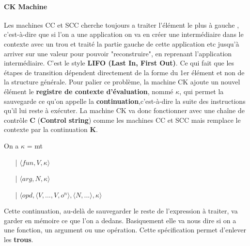 \documentclass[10pt,a4paper]{report}
\begin{document}
\paragraph{CK Machine}

Les machines CC et SCC cherche toujours a traiter l'élément le plus à gauche , c'est-à-dire que si l'on a une application on va en créer une intermédiaire dans le contexte avec un trou et traité la partie gauche de cette application etc jusqu'à arriver sur une valeur pour pouvoir "reconstruire", en reprenant l'application intermédiaire. C'est le style \textbf{ LIFO (Last In, First Out)}. Ce qui fait que les étapes de transition dépendent directement de la forme du 1er élément et non de la structure générale.
\smallbreak
Pour palier ce problème, la machine CK ajoute un nouvel élément le \textbf{registre de contexte d'évaluation}, nommé $\kappa$, qui permet la sauvegarde ce qu'on appelle la \textbf{continuation},c'est-à-dire la suite des instructions qu'il lui reste à exécuter.
\smallbreak
La machine CK va donc fonctionner avec une chaîne de contrôle \textbf{C} (\textbf{Control string}) comme les machines CC et SCC mais remplace le contexte par la continuation \textbf{K}. 
\medbreak

On a $\kappa$ = mt
\begin{itemize}
\item[|] $\langle fun,V,\kappa \rangle$
\item[|] $\langle arg,N,\kappa \rangle$
\item[|] $\langle opd,\langle V,...,V,o^{n}\rangle,\langle N,... \rangle,\kappa \rangle$
\end{itemize}
\smallbreak
Cette continuation, au-delà de sauvegarder le reste de l'expression à traiter, va garder en mémoire ce que l'on a dedans. Basiquement elle va nous dire si on a une fonction, un argument ou une opération. Cette spécification permet d'enlever les \textbf{trous}.
\medbreak
\end{document}
